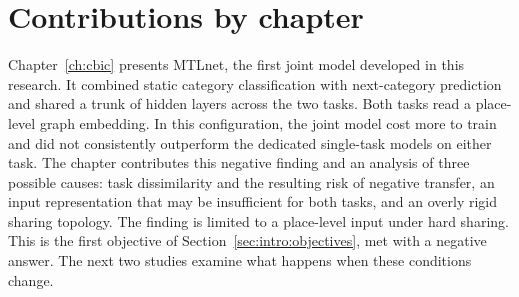 \section{Contributions by chapter}
\label{sec:conc:contributions}

Chapter~\ref{ch:cbic} presents MTLnet, the first joint model developed in this research.
It combined static category classification with next-category prediction and shared a
trunk of hidden layers across the two tasks. Both tasks read a place-level graph embedding. In
this configuration, the joint model cost more to train and did not consistently
outperform the dedicated single-task models on either task. The chapter contributes
this negative finding and an analysis of three possible causes: task dissimilarity and
the resulting risk of negative transfer, an input representation that may be
insufficient for both tasks, and an overly rigid sharing topology. The finding is
limited to a place-level input under hard sharing. This is the first objective of
Section~\ref{sec:intro:objectives}, met with a negative answer. The next two studies
examine what happens when these conditions change.

